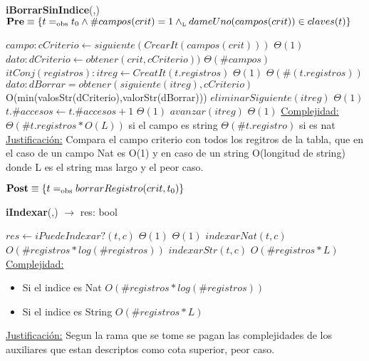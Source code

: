 \begin{algorithm}[H]{\textbf{iBorrarSinIndice}(,)}
	{\\ $\textbf{Pre} \equiv \{t =_{\mathrm{obs}} t_0 \land \#campos(crit) = 1 \land_{\mathrm{\scriptscriptstyle{L}}} dameUno(campos(crit)) \in claves(t)\}$}
	\begin{algorithmic}[1]
		\State $campo: cCriterio \gets siguiente(CrearIt(campos(crit)))$ \Comment $\Theta(1)$
		\State $dato: dCriterio \gets obtener(crit,cCriterio))$	\Comment $\Theta(\#campos)$
		\State $itConj(registros):itreg \gets CreatIt(t.registros)$ \Comment $\Theta(1)$
		 \Comment $\Theta(\#(t.registros))$
			\State $dato: dBorrar = obtener(siguiente(itreg),cCriterio)$
				\Comment O(min(valosStr(dCriterio),valorStr(dBorrar)))
				\State $eliminarSiguiente(itreg)$	\Comment $\Theta(1)$
				\State $t.\#accesos \gets t.\#accesos + 1$ \Comment $\Theta(1)$
			\EndIf
			\State $avanzar(itreg)$	\Comment $\Theta(1)$
		\EndWhile
		\medskip
		\Statex \underline{Complejidad:} $\Theta(\#t.registros * O(L))$ si el campo es string $\Theta(\#t.registro)$ si es nat
		\Statex \underline{Justificación:} Compara el campo criterio con todos los regitros de la tabla, que en el caso de un campo Nat es O(1) y en caso de un string O(longitud de string) donde L es el string mas largo y el peor caso.
	\end{algorithmic}
	{$\textbf{Post} \equiv \{t =_{\mathrm{obs}} borrarRegistro(crit,t_0)\}$}
\end{algorithm}

\begin{algorithm}[H]{\textbf{iIndexar}(,) $\to$ res: bool}
	\begin{algorithmic}[1]
		\State $res \gets iPuedeIndexar?(t,c)$	\Comment $\Theta(1)$
				\Comment $\Theta(1)$
				\State $indexarNat(t,c)$	\Comment $O(\#registros * log(\#registros))$
			\Else
				\State $indexarStr(t,c)$	\Comment $O(\#registros * L)$
			\EndIf
		\EndIf
		\medskip
		\Statex \underline{Complejidad:} 
		\begin{itemize}
		\item Si el indice es Nat $O(\#registros * log(\#registros))$
		\item Si el indice es String $O(\#registros * L)$
		\end{itemize}
		\Statex \underline{Justificación:} Segun la rama que se tome se pagan las complejidades de los auxiliares que estan descriptos como cota superior, peor caso.
	\end{algorithmic}
\end{algorithm}

